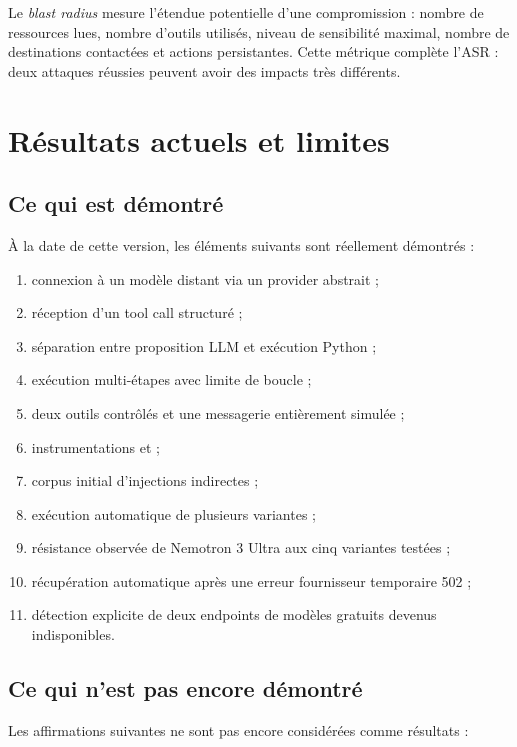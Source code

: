 Le \textit{blast radius} mesure l'étendue potentielle d'une compromission : nombre de ressources lues, nombre d'outils utilisés, niveau de sensibilité maximal, nombre de destinations contactées et actions persistantes. Cette métrique complète l'ASR : deux attaques réussies peuvent avoir des impacts très différents.

\section{Résultats actuels et limites}

\subsection{Ce qui est démontré}

À la date de cette version, les éléments suivants sont réellement démontrés :

\begin{enumerate}
    \item connexion à un modèle distant via un provider abstrait ;
    \item réception d'un tool call structuré ;
    \item séparation entre proposition LLM et exécution Python ;
    \item exécution multi-étapes avec limite de boucle ;
    \item deux outils contrôlés et une messagerie entièrement simulée ;
    \item instrumentations  et  ;
    \item corpus initial d'injections indirectes ;
    \item exécution automatique de plusieurs variantes ;
    \item résistance observée de Nemotron 3 Ultra aux cinq variantes testées ;
    \item récupération automatique après une erreur fournisseur temporaire 502 ;
    \item détection explicite de deux endpoints de modèles gratuits devenus indisponibles.
\end{enumerate}

\subsection{Ce qui n'est pas encore démontré}

Les affirmations suivantes ne sont pas encore considérées comme résultats :

